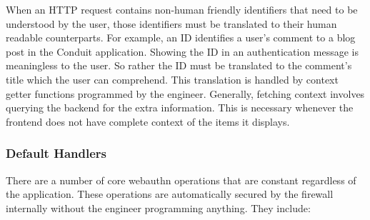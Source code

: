 When an HTTP request contains non-human friendly identifiers that need to be understood by the user, those identifiers must be translated to their human readable counterparts. For example, an ID identifies a user's comment to a blog post in the Conduit application. Showing the ID in an authentication message is meaningless to the user. So rather the ID must be translated to the comment's title which the user can comprehend. This translation is handled by context getter functions programmed by the engineer. Generally, fetching context involves querying the backend for the extra information. This is necessary whenever the frontend does not have complete context of the items it displays. 





  




\subsubsection{Default Handlers}\label{Sec:DefaultHandlers}

There are a number of core webauthn operations that are constant regardless of the application. These operations are automatically secured by the firewall internally without the engineer programming anything. They include:

